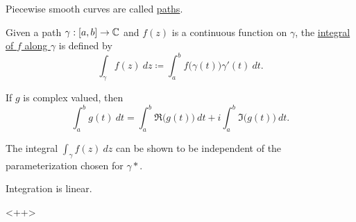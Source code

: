\documentclass[11pt]{article}
\begin{document}
\begin{remark}
Piecewise smooth curves are called \underline{paths}.
\end{remark}
\begin{definition}
Given a path $\gamma:[a,b] \to \mathbb{C}$ and $f(z)$ is a continuous function on
$\gamma$, the \underline{integral of $f$ along $\gamma$} is defined by
\begin{equation*}
\int_\gamma f(z)\>dz \coloneqq \int^b_a f\big(\gamma(t)\big)\gamma'(t)\>dt.
\end{equation*}
\end{definition}
\begin{remark}
If $g$ is complex valued, then
\begin{equation*}
\int^b_a g(t)\>dt = \int^b_a \Re\big(g(t)\big)\> dt + i \int^b_a
\Im\big(g(t)\big)\> dt.
\end{equation*}
\end{remark}
\begin{remark}
The integral $\int_\gamma f(z)\>dz$ can be shown to be independent of the
parameterization chosen for $\gamma*$.
\end{remark}
\begin{theorem}
Integration is linear.
\end{theorem}<++>
\end{document}
